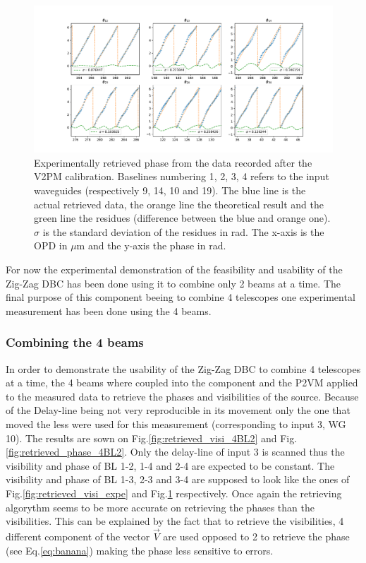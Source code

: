 \begin{figure}[htbp!]
 \centering
 \includegraphics[scale=.4]{../picture/retrieve_phase_expe2.pdf}
 \caption{Experimentally retrieved phase from the data recorded after the V2PM calibration. Baselines numbering 1, 2, 3, 4 refers to the input waveguides (respectively  9, 14, 10 and 19). The blue line is the actual retrieved data, the orange line the theoretical result and the green line the residues (difference between the blue and orange one). $\sigma$ is the standard deviation of the residues in rad. The x-axis is the OPD in $\mu$m and the y-axis the phase in rad. }
 \label{fig:retrieved_phase_expe2}
\end{figure}

For now the experimental demonstration of the feasibility and usability of the Zig-Zag DBC has been done using it to combine only 2 beams at a time. The final purpose of this component beeing to combine 4 telescopes one experimental measurement has been done using the 4 beams.

\subsubsection{Combining the 4 beams}
In order to demonstrate the usability of the Zig-Zag DBC to combine 4 telescopes at a time, the 4 beams where coupled into the component and the P2VM applied to the measured data to retrieve the phases and visibilities of the source. Because of the Delay-line being not very reproducible in its movement only the one that moved the less were used for this measurement (corresponding to input 3, WG 10). The results are sown on Fig.\ref{fig:retrieved_visi_4BL2} and Fig.\ref{fig:retrieved_phase_4BL2}. Only the delay-line of input 3 is scanned thus the visibility and phase of BL 1-2, 1-4 and 2-4 are expected to be constant. The visibility and phase of BL 1-3, 2-3 and 3-4 are supposed to look like the ones of Fig.\ref{fig:retrieved_visi_expe}  and Fig.\ref{fig:retrieved_phase_expe2} respectively. Once again the retrieving algorythm seems to be more accurate on retrieving the phases than the visibilities. This can be explained by the fact that to retrieve the visibilities, 4 different component of the vector $\vec{V}$ are used opposed to 2 to retrieve the phase (see Eq.\ref{eq:banana}) making the phase less sensitive to errors.

